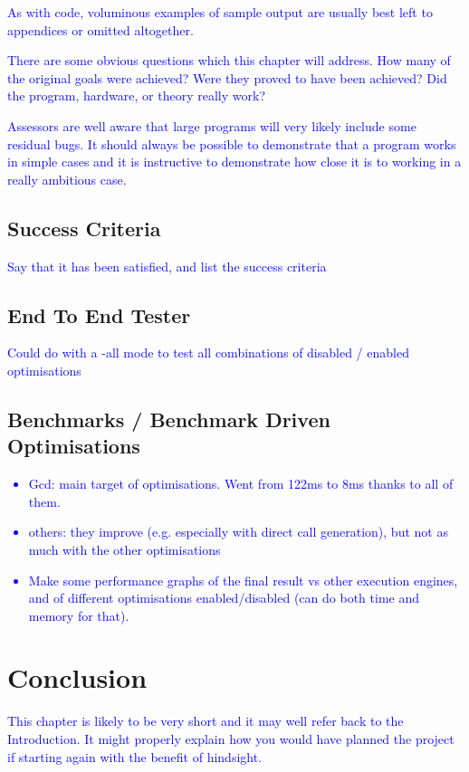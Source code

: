 \documentclass[12pt,twoside,notitlepage]{report}
\newcommand\note[1]{\textcolor{blue}{#1}}
\begin{document}
\note{As with code, voluminous examples of sample output are usually best left to appendices or omitted altogether.}

\note{There are some obvious questions which this chapter will address. How many of the original goals were achieved? Were they proved to have been achieved? Did the program, hardware, or theory really work?}

\note{Assessors are well aware that large programs will very likely include some residual bugs. It should always be possible to demonstrate that a program works in simple cases and it is instructive to demonstrate how close it is to working in a really ambitious case.}

\section{Success Criteria}
\note{Say that it has been satisfied, and list the success criteria}

\section{End To End Tester}
\note{Could do with a -all mode to test all combinations of disabled / enabled optimisations}

\section{Benchmarks / Benchmark Driven Optimisations}
\note{
	\begin{itemize}
		\item Gcd: main target of optimisations. Went from 122ms to 8ms thanks to all of them.
		\item others: they improve (e.g. especially with direct call generation), but not as much with the other optimisations
		\item Make some performance graphs of the final result vs other execution engines, and of different optimisations enabled/disabled (can do both time and memory for that).
	\end{itemize}
}






\clearpage
\chapter{Conclusion}
\note{This chapter is likely to be very short and it may well refer back to the Introduction. It might properly explain how you would have planned the project if starting again with the benefit of hindsight. }
\end{document}

